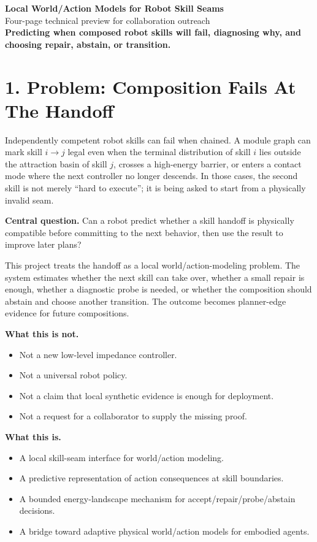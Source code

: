 \documentclass[10pt]{article}
\newcommand{\boxnote}[1]{\colorbox{soft}{\parbox{\dimexpr\linewidth-2\fboxsep}{#1}}}
\begin{document}
\begin{center}
{\LARGE \textbf{Local World/Action Models for Robot Skill Seams}}\\
{\large Four-page technical preview for collaboration outreach}\\[3pt]
\textcolor{accent}{\textbf{Predicting when composed robot skills will fail, diagnosing why, and choosing repair, abstain, or transition.}}
\end{center}

\section*{1. Problem: Composition Fails At The Handoff}

Independently competent robot skills can fail when chained. A module graph can mark skill $i\rightarrow j$ legal even when the terminal distribution of skill $i$ lies outside the attraction basin of skill $j$, crosses a high-energy barrier, or enters a contact mode where the next controller no longer descends. In those cases, the second skill is not merely ``hard to execute''; it is being asked to start from a physically invalid seam.

\boxnote{\textbf{Central question.} Can a robot predict whether a skill handoff is physically compatible before committing to the next behavior, then use the result to improve later plans?}

This project treats the handoff as a local world/action-modeling problem. The system estimates whether the next skill can take over, whether a small repair is enough, whether a diagnostic probe is needed, or whether the composition should abstain and choose another transition. The outcome becomes planner-edge evidence for future compositions.

\textbf{What this is not.}
\begin{itemize}
\item Not a new low-level impedance controller.
\item Not a universal robot policy.
\item Not a claim that local synthetic evidence is enough for deployment.
\item Not a request for a collaborator to supply the missing proof.
\end{itemize}

\textbf{What this is.}
\begin{itemize}
\item A local skill-seam interface for world/action modeling.
\item A predictive representation of action consequences at skill boundaries.
\item A bounded energy-landscape mechanism for accept/repair/probe/abstain decisions.
\item A bridge toward adaptive physical world/action models for embodied agents.
\end{itemize}
\end{document}
